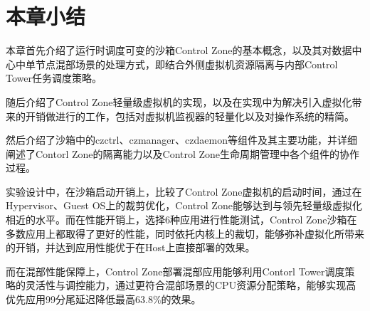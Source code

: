 
\section{本章小结}


本章首先介绍了运行时调度可变的沙箱Control Zone的基本概念，以及其对数据中心中单节点混部场景的处理方式，即结合外侧虚拟机资源隔离与内部Control Tower任务调度策略。

随后介绍了Control Zone轻量级虚拟机的实现，以及在实现中为解决引入虚拟化带来的开销做进行的工作，包括对虚拟机监视器的轻量化以及对操作系统的精简。

然后介绍了沙箱中的czctrl、czmanager、czdaemon等组件及其主要功能，并详细阐述了Contorl Zone的隔离能力以及Control Zone生命周期管理中各个组件的协作过程。

实验设计中，在沙箱启动开销上，比较了Control Zone虚拟机的启动时间，通过在Hypervisor、Guest OS上的裁剪优化，Control Zone能够达到与领先轻量级虚拟化相近的水平。而在性能开销上，选择6种应用进行性能测试，Control Zone沙箱在多数应用上都取得了更好的性能，同时依托内核上的裁切，能够弥补虚拟化所带来的开销，并达到应用性能优于在Host上直接部署的效果。

而在混部性能保障上，Control Zone部署混部应用能够利用Contorl Tower调度策略的灵活性与调控能力，通过更符合混部场景的CPU资源分配策略，能够实现高优先应用99分尾延迟降低最高63.8\%的效果。